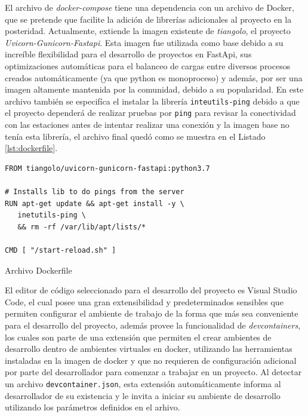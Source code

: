 El archivo de \textit{docker-compose} tiene una dependencia con un archivo de Docker, que se pretende que facilite la adición de librerías adicionales al proyecto en la posteridad. Actualmente, extiende la imagen existente de \textit{tiangolo}, el proyecto \textit{Uvicorn-Gunicorn-Fastapi}. Esta imagen fue utilizada como base debido a su increíble flexibilidad para el desarrollo de proyectos en FastApi, sus optimizaciones automáticas para el balanceo de cargas entre diversos procesos creados automáticamente (ya que python es monoproceso) y además, por ser una imagen altamente mantenida por la comunidad, debido a su popularidad. En este archivo también se especifíca el instalar la librería \texttt{inteutils-ping} debido a que el proyecto dependerá de realizar pruebas por \texttt{ping} para revisar la conectividad con las estaciones antes de intentar realizar una conexión y la imagen base no tenía esta librería, el archivo final quedó como se muestra en el Listado \ref{lst:dockerfile}.


\begin{listing}[h]
\begin{verbatim}
FROM tiangolo/uvicorn-gunicorn-fastapi:python3.7

# Installs lib to do pings from the server
RUN apt-get update && apt-get install -y \
   inetutils-ping \
   && rm -rf /var/lib/apt/lists/*

CMD [ "/start-reload.sh" ]
\end{verbatim}
\caption[Dockerfile]{Archivo Dockerfile}
\label{lst:dockerfile}
\end{listing}

El editor de código seleccionado para el desarrollo del proyecto es Visual Studio Code, el cual posee una gran extensibilidad y predeterminados sensibles que permiten configurar el ambiente de trabajo de la forma que más sea conveniente para el desarrollo del proyecto, además provee la funcionalidad de \textit{devcontainers}, los cuales son parte de una extensión que permiten el crear ambientes de desarrollo dentro de ambientes virtuales en docker, utilizando las herramientas instaladas en la imagen de docker y que no requieren de configuración adicional por parte del desarrollador para comenzar a trabajar en un proyecto. Al detectar un archivo \texttt{devcontainer.json}, esta extensión automáticamente informa al desarrollador de su existencia y le invita a iniciar su ambiente de desarrollo utilizando los parámetros definidos en el arhivo.

